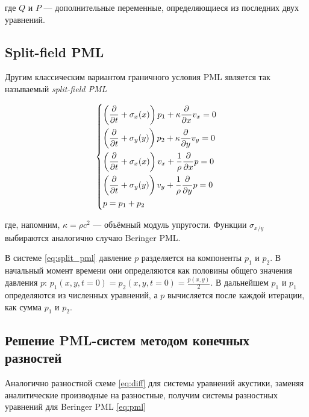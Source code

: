 где $Q$ и $P$ --- дополнительные переменные, определяющиеся из последних двух уравнений.
    
\subsection{Split-field PML}

Другим классическим вариантом граничного условия PML является так называемый \textit{split-field PML}

\begin{equation}
	\begin{dcases}
	    \left(\frac{\partial}{\partial t} + \sigma_x(x)\right) p_1 + \kappa \frac{\partial}{\partial x} v_x = 0 \\
	    \left(\frac{\partial}{\partial t} + \sigma_y(y)\right) p_2 + \kappa \frac{\partial}{\partial y} v_y = 0 \\
	    \left(\frac{\partial}{\partial t} + \sigma_x(x)\right) v_x + \frac{1}{\rho} \frac{\partial}{\partial x} p = 0 \\
	    \left(\frac{\partial}{\partial t} + \sigma_y(y)\right) v_y + \frac{1}{\rho} \frac{\partial}{\partial y} p = 0 \\
	    p = p_1 + p_2
	\end{dcases}\label{eq:split_pml} 
\end{equation}
    
где, напомним,  $\kappa = \rho c^2$ --- объёмный модуль упругости. Функции $\sigma_{x/y}$ выбираются аналогично случаю Beringer PML.

В системе \ref{eq:split_pml} давление $p$ разделяется на  компоненты $p_1$ и $p_2$. В начальный момент времени они определяются как половины общего значения давления $p$: $p_1(x,y,t=0) = p_2(x,y,t=0) = \frac{p(x,y)}{2}$. В дальнейшем $p_1$ и $p_1$ определяются из численных уравнений, а $p$ вычисляется после каждой итерации, как сумма $p_1$ и $p_2$. 
    
\subsection{Решение PML-систем методом конечных разностей}
    
Аналогично разностной схеме \eqref{eq:diff} для системы уравнений  акустики, заменяя аналитические производные на разностные, получим системы разностных уравнений для Beringer PML \ref{eq:pml}
    
